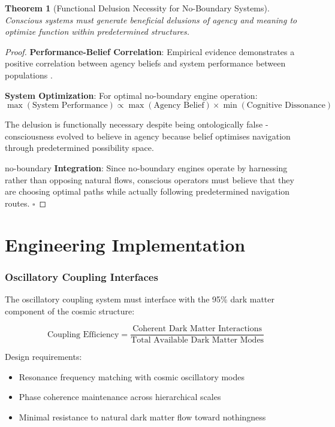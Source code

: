 \documentclass[11pt,a4paper]{article}
\newtheorem{theorem}{Theorem}[section]
\theoremstyle{remark}
\begin{document}
\begin{theorem}[Functional Delusion Necessity for No-Boundary Systems]
Conscious systems must generate beneficial delusions of agency and meaning to optimize function within predetermined structures.
\end{theorem}

\begin{proof}
\textbf{Performance-Belief Correlation}: Empirical evidence demonstrates a positive correlation between agency beliefs and system performance between populations \cite{bandura1997self}.

\textbf{System Optimization}: For optimal no-boundary engine operation:
\begin{equation}
\max(\text{System Performance}) \propto \max(\text{Agency Belief}) \times \min(\text{Cognitive Dissonance})
\end{equation}

 The delusion is functionally necessary despite being ontologically false - consciousness evolved to believe in agency because belief optimises navigation through predetermined possibility space.

no-boundary \textbf{ Integration}: Since no-boundary engines operate by harnessing rather than opposing natural flows, conscious operators must believe that they are choosing optimal paths while actually following predetermined navigation routes. $\square$
\end{proof}

\section{Engineering Implementation}

\subsubsection{Oscillatory Coupling Interfaces}

The oscillatory coupling system must interface with the 95\% dark matter component of the cosmic structure:

\begin{equation}
\text{Coupling Efficiency} = \frac{\text{Coherent Dark Matter Interactions}}{\text{Total Available Dark Matter Modes}}
\end{equation}

Design requirements:
\begin{itemize}
\item Resonance frequency matching with cosmic oscillatory modes
\item Phase coherence maintenance across hierarchical scales
\item Minimal resistance to natural dark matter flow toward nothingness
\end{itemize}
\end{document}
